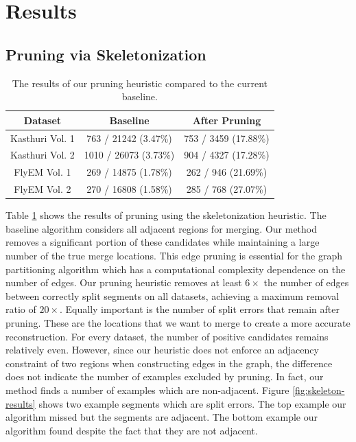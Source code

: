 \section{Results}

\subsection{Pruning via Skeletonization}

\begin{table}
	\centering
	\small
	\begin{tabular}{c c c} \hline
		\textbf{Dataset} & \textbf{Baseline} & \textbf{After Pruning} \\ \hline
		Kasthuri Vol. 1 & 763 / 21242 (3.47\%) & 753 / 3459 (17.88\%) \\
		Kasthuri Vol. 2 & 1010 / 26073 (3.73\%) & 904 / 4327 (17.28\%) \\
		FlyEM Vol. 1 & 269 / 14875 (1.78\%) & 262 / 946 (21.69\%) \\
		FlyEM Vol. 2 & 270 / 16808 (1.58\%) & 285 / 768 (27.07\%)\\ \hline
	\end{tabular}
	\caption{The results of our pruning heuristic compared to the current baseline.}
	\label{table:skeletonization}
\end{table}

Table \ref{table:skeletonization} shows the results of pruning using the skeletonization heuristic.
The baseline algorithm considers all adjacent regions for merging. 
Our method removes a significant portion of these candidates while maintaining a large number of the true merge locations.
This edge pruning is essential for the graph partitioning algorithm which has a computational complexity dependence on the number of edges. 
Our pruning heuristic removes at least $6\times$ the number of edges between correctly split segments on all datasets, achieving a maximum removal ratio of $20\times$. 
Equally important is the number of split errors that remain after pruning.
These are the locations that we want to merge to create a more accurate reconstruction.
For every dataset, the number of positive candidates remains relatively even. 
However, since our heuristic does not enforce an adjacency constraint of two regions when constructing edges in the graph, the difference does not indicate the number of examples excluded by pruning. 
In fact, our method finds a number of examples which are non-adjacent.
Figure \ref{fig:skeleton-results} shows two example segments which are split errors.
The top example our algorithm missed but the segments are adjacent. 
The bottom example our algorithm found despite the fact that they are not adjacent.

